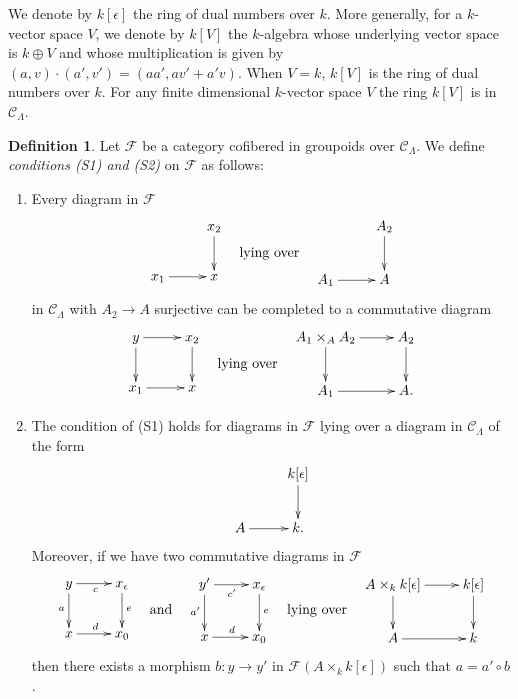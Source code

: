 \documentclass{stacks-project}
\theoremstyle{plain}
\theoremstyle{definition}
\newtheorem{definition}[subsection]{Definition}
\theoremstyle{remark}
\numberwithin{equation}{subsection}
\begin{document}
\medskip\noindent
We denote by $k[\epsilon]$ the ring of dual numbers over $k$.  More
generally, for a $k$-vector space $V$, we denote by $k[V]$ the $k$-algebra
whose underlying vector space is $k \oplus V$ and whose multiplication is given
by $(a, v) \cdot (a', v') = (aa', av' + a'v)$.  When $V = k$, $k[V]$ is the ring
of dual numbers over $k$.  For any finite dimensional $k$-vector space $V$
the ring $k[V]$ is in $\mathcal{C}_\Lambda$.

\begin{definition}
\label{definition-S1-S2}
Let $\mathcal{F}$ be a category cofibered in groupoids over $\mathcal
C_\Lambda$. We define {\it conditions (S1) and (S2)}
on $\mathcal{F}$ as follows:
\begin{enumerate}
\item[(S1)] Every diagram in $\mathcal{F}$
$$
\vcenter{
\xymatrix{
           & x_2 \ar[d] \\
x_1 \ar[r] & x
}
}
\quad\text{lying over}\quad
\vcenter{
\xymatrix{
           & A_2 \ar[d] \\
A_1 \ar[r] & A
}
}
$$
in $\mathcal{C}_\Lambda$ with $A_2 \to A$ surjective can be completed
to a commutative diagram
$$
\vcenter{
\xymatrix{
y \ar[r] \ar[d] & x_2 \ar[d] \\
x_1 \ar[r]      & x
}
}
\quad\text{lying over}\quad
\vcenter{
\xymatrix{
A_1 \times_A A_2 \ar[r] \ar[d] & A_2 \ar[d] \\
A_1 \ar[r]      & A.
}
}
$$
\item[(S2)]
The condition of (S1) holds for diagrams in $\mathcal{F}$ lying over
a diagram in $\mathcal{C}_\Lambda$ of the form
$$
\xymatrix{
          & k[\epsilon] \ar[d] \\
A  \ar[r] & k.
}
$$
Moreover, if we have two commutative diagrams in $\mathcal{F}$
$$
\vcenter{
\xymatrix{
y \ar[r]_c \ar[d]_a & x_\epsilon \ar[d]^e \\
x \ar[r]^d          & x_0
}
}
\quad\text{and}\quad
\vcenter{
\xymatrix{
y' \ar[r]_{c'} \ar[d]_{a'} & x_\epsilon \ar[d]^e \\
x \ar[r]^d                 & x_0
}
}
\quad\text{lying over}\quad
\vcenter{
\xymatrix{
A \times_k k[\epsilon] \ar[r] \ar[d] & k[\epsilon] \ar[d] \\
A  \ar[r] & k
}
}
$$
then there exists a morphism $b : y \to y'$ in
$\mathcal{F}(A \times_k k[\epsilon])$ such that $a = a' \circ b$.
\end{enumerate}
\end{definition}
\end{document}
